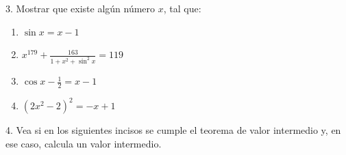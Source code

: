 \documentclass[12pt]{article}
\begin{document}
3. Mostrar que existe algún número $x$, tal que:

\begin{enumerate}[\hspace{9px} a)]
    \item \(\sin x = x-1\)
    \item \(x^{179}+\displaystyle\frac{163}{1+x^2+\sin^2 x}=119\)
    \item \(\cos x - \displaystyle\frac{1}{2}=x-1\)
    \item \((2x^2-2)^2=-x+1\)
\end{enumerate}

4. Vea si en los siguientes incisos se cumple el teorema de valor intermedio y, en ese caso, calcula un valor intermedio.
\end{document}
